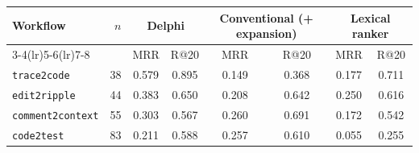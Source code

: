 \begin{tabular}{lrcccccc}
\toprule
Workflow & $n$ & \multicolumn{2}{c}{Delphi} & \multicolumn{2}{c}{Conventional (+ expansion)} & \multicolumn{2}{c}{Lexical ranker} \\
\cmidrule(lr){3-4}\cmidrule(lr){5-6}\cmidrule(lr){7-8}
 & & MRR & R@20 & MRR & R@20 & MRR & R@20 \\
\midrule
\texttt{trace2code} & 38 & 0.579 & 0.895 & 0.149 & 0.368 & 0.177 & 0.711 \\
\texttt{edit2ripple} & 44 & 0.383 & 0.650 & 0.208 & 0.642 & 0.250 & 0.616 \\
\texttt{comment2context} & 55 & 0.303 & 0.567 & 0.260 & 0.691 & 0.172 & 0.542 \\
\texttt{code2test} & 83 & 0.211 & 0.588 & 0.257 & 0.610 & 0.055 & 0.255 \\
\bottomrule
\end{tabular}%
